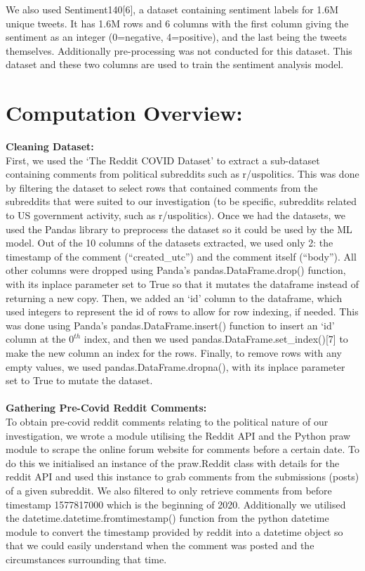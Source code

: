 \documentclass[fontsize=11pt]{article}
\begin{document}
We also used Sentiment140[6], a dataset containing sentiment labels for 1.6M unique tweets. It has 1.6M rows and 6 columns with the first column giving the sentiment as an integer (0=negative, 4=positive), and the last being the tweets themselves. Additionally pre-processing was not conducted for this dataset. This dataset and these two columns are used to train the sentiment analysis model.


\section*{Computation Overview:}
\textbf{Cleaning Dataset:}\\
First, we used the `The Reddit COVID Dataset’ to extract a sub-dataset containing comments from political subreddits such as r/uspolitics. This was done by filtering the dataset to select rows that contained comments from the subreddits that were suited to our investigation (to be specific, subreddits related to US government activity, such as r/uspolitics). 
Once we had the datasets, we used the Pandas library to preprocess the dataset so it could be used by the ML model. Out of the 10 columns of the datasets extracted, we used only 2:
the timestamp of the comment (“created\_utc”) and the comment itself (“body”). All other columns were dropped using Panda’s pandas.DataFrame.drop() function, with its inplace parameter set to True so that it mutates the dataframe instead of returning a new copy. Then, we added an ‘id’ column to the dataframe, which used integers to represent the id of rows to allow for row indexing, if needed. This was done using Panda’s pandas.DataFrame.insert() function to insert an ‘id’ column at the $0^{th}$ index, and then we used pandas.DataFrame.set\_index()[7] to make the new column an index for the rows. Finally, to remove rows with any empty values, we used pandas.DataFrame.dropna(), with its inplace parameter set to True to mutate the dataset. \\\\
\textbf{Gathering Pre-Covid Reddit Comments:} \\
To obtain pre-covid reddit comments relating to the political nature of our investigation, we wrote a module utilising the Reddit API and the Python praw module to scrape the online forum website for comments before a certain date. To do this we initialised an instance of the praw.Reddit class with details for the reddit API and used this instance to grab comments from the submissions (posts) of a given subreddit. We also filtered to only retrieve comments from before timestamp 1577817000 which is the beginning of 2020. Additionally we utilised the datetime.datetime.fromtimestamp() function from the python datetime module to convert the timestamp provided by reddit into a datetime object so that we could easily understand when the comment was posted and the circumstances surrounding that time.\\\\
\end{document}
